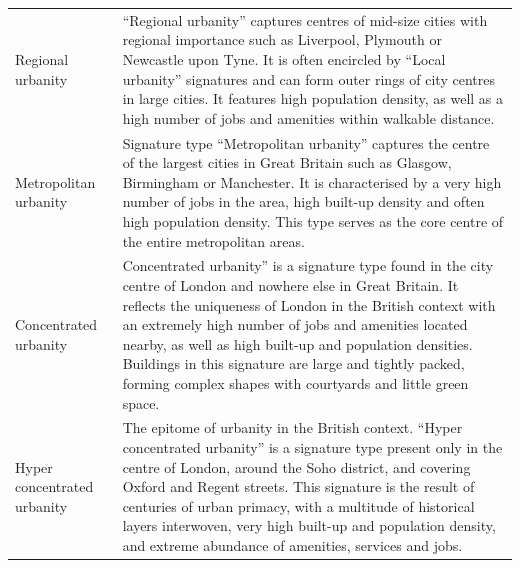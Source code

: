 \documentclass[fleqn,10pt]{wlscirep}
\begin{document}
\begin{longtable}{p{}p{}}
    Regional urbanity                    &                                                             “Regional urbanity” captures centres of mid-size cities with regional importance such as Liverpool, Plymouth or Newcastle upon Tyne. It is often encircled by “Local urbanity” signatures and can form outer rings of city centres in large cities. It features high population density, as well as a high number of jobs and amenities within walkable distance. \\
    Metropolitan urbanity                &                                                                                    Signature type “Metropolitan urbanity” captures the centre of the largest cities in Great Britain such as Glasgow, Birmingham or Manchester. It is characterised by a very high number of jobs in the area, high built-up density and often high population density. This type serves as the core centre of the entire metropolitan areas. \\
    Concentrated urbanity                &  Concentrated urbanity” is a signature type found in the city centre of London and nowhere else in Great Britain. It reflects the uniqueness of London in the British context with an extremely high number of jobs and amenities located nearby, as well as high built-up and population densities. Buildings in this signature are large and tightly packed, forming complex shapes with courtyards and little green space. \\
    Hyper concentrated urbanity          &     The epitome of urbanity in the British context. “Hyper concentrated urbanity” is a signature type present only in the centre of London, around the Soho district, and covering Oxford and Regent streets. This signature is the result of centuries of urban primacy, with a multitude of historical layers interwoven, very high built-up and population density, and extreme abundance of amenities, services and jobs. \\
    \bottomrule
\end{longtable}
\end{document}
